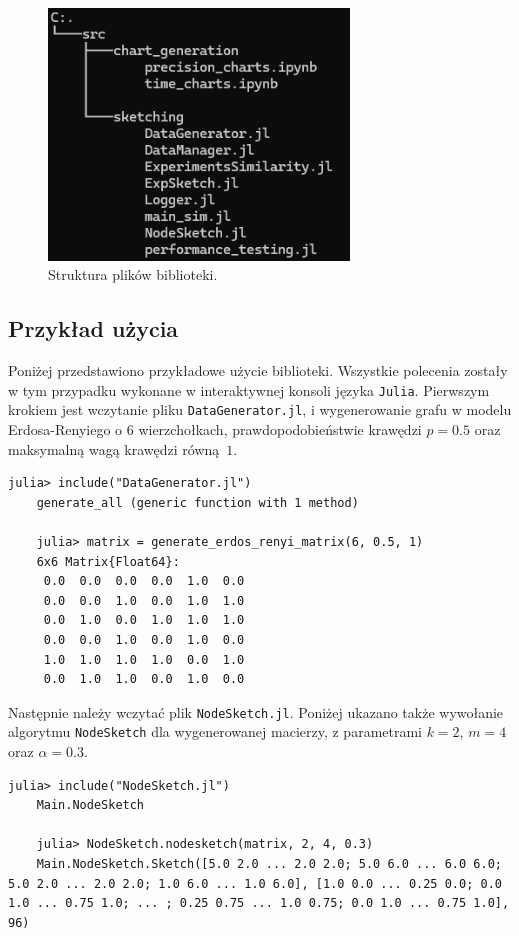 \newpage

\begin{figure}[!ht]
    \includegraphics[width=8cm]{img/folder_structure.png}
    \centering
    \caption[Struktura plików]{Struktura plików biblioteki.}
    \label{fig:folder_structure}
\end{figure}

\subsection*{Przykład użycia}

Poniżej przedstawiono przykładowe użycie biblioteki. Wszystkie polecenia zostały w tym przypadku wykonane w interaktywnej konsoli języka \texttt{Julia}. Pierwszym krokiem jest wczytanie pliku \texttt{DataGenerator.jl}, i wygenerowanie grafu w modelu Erdosa-Renyiego o $6$ wierzchołkach, prawdopodobieństwie krawędzi $p = 0.5$ oraz maksymalną wagą krawędzi równą~$1$.

\begin{lstlisting}[basicstyle=\footnotesize]
    julia> include("DataGenerator.jl")
    generate_all (generic function with 1 method)
    
    julia> matrix = generate_erdos_renyi_matrix(6, 0.5, 1)
    6x6 Matrix{Float64}:
     0.0  0.0  0.0  0.0  1.0  0.0
     0.0  0.0  1.0  0.0  1.0  1.0
     0.0  1.0  0.0  1.0  1.0  1.0
     0.0  0.0  1.0  0.0  1.0  0.0
     1.0  1.0  1.0  1.0  0.0  1.0
     0.0  1.0  1.0  0.0  1.0  0.0
\end{lstlisting}

Następnie należy wczytać plik \texttt{NodeSketch.jl}. Poniżej ukazano także wywołanie algorytmu \texttt{NodeSketch} dla wygenerowanej macierzy, z parametrami $k = 2$, $m = 4$ oraz $\alpha = 0.3$.

\begin{lstlisting}[basicstyle=\footnotesize]
    julia> include("NodeSketch.jl")
    Main.NodeSketch
    
    julia> NodeSketch.nodesketch(matrix, 2, 4, 0.3)
    Main.NodeSketch.Sketch([5.0 2.0 ... 2.0 2.0; 5.0 6.0 ... 6.0 6.0; 5.0 2.0 ... 2.0 2.0; 1.0 6.0 ... 1.0 6.0], [1.0 0.0 ... 0.25 0.0; 0.0 1.0 ... 0.75 1.0; ... ; 0.25 0.75 ... 1.0 0.75; 0.0 1.0 ... 0.75 1.0], 96)
\end{lstlisting}

